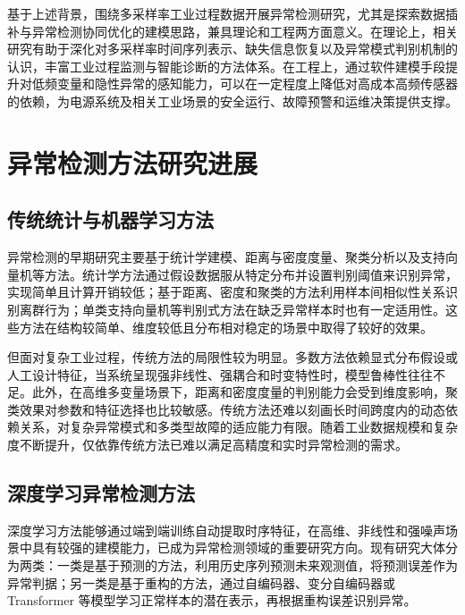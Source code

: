 \documentclass[bachelor, vlined]{DissertUESTC}
\begin{document}
    基于上述背景，围绕多采样率工业过程数据开展异常检测研究，尤其是探索数据插补与异常检测协同优化的建模思路，兼具理论和工程两方面意义。在理论上，相关研究有助于深化对多采样率时间序列表示、缺失信息恢复以及异常模式判别机制的认识，丰富工业过程监测与智能诊断的方法体系。在工程上，通过软件建模手段提升对低频变量和隐性异常的感知能力，可以在一定程度上降低对高成本高频传感器的依赖，为电源系统及相关工业场景的安全运行、故障预警和运维决策提供支撑。

	\section{异常检测方法研究进展}

	\subsection{传统统计与机器学习方法}

    异常检测的早期研究主要基于统计学建模、距离与密度度量、聚类分析以及支持向量机等方法。统计学方法通过假设数据服从特定分布并设置判别阈值来识别异常，实现简单且计算开销较低；基于距离、密度和聚类的方法利用样本间相似性关系识别离群行为；单类支持向量机等判别式方法在缺乏异常样本时也有一定适用性。这些方法在结构较简单、维度较低且分布相对稳定的场景中取得了较好的效果。

    但面对复杂工业过程，传统方法的局限性较为明显。多数方法依赖显式分布假设或人工设计特征，当系统呈现强非线性、强耦合和时变特性时，模型鲁棒性往往不足。此外，在高维多变量场景下，距离和密度度量的判别能力会受到维度影响，聚类效果对参数和特征选择也比较敏感。传统方法还难以刻画长时间跨度内的动态依赖关系，对复杂异常模式和多类型故障的适应能力有限。随着工业数据规模和复杂度不断提升，仅依靠传统方法已难以满足高精度和实时异常检测的需求。

	\subsection{深度学习异常检测方法}

    深度学习方法能够通过端到端训练自动提取时序特征，在高维、非线性和强噪声场景中具有较强的建模能力，已成为异常检测领域的重要研究方向。现有研究大体分为两类：一类是基于预测的方法，利用历史序列预测未来观测值，将预测误差作为异常判据；另一类是基于重构的方法，通过自编码器、变分自编码器或 Transformer 等模型学习正常样本的潜在表示，再根据重构误差识别异常。
\end{document}

